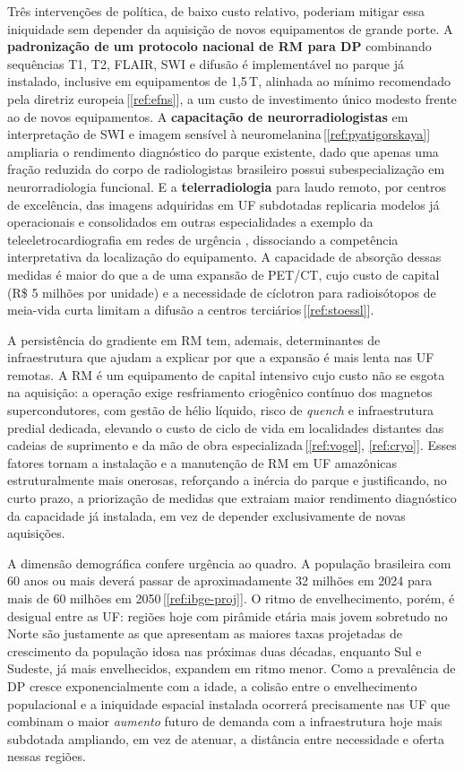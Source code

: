 \documentclass[12pt,a4paper,oneside]{article}
\begin{document}
Três intervenções de política, de baixo custo relativo, poderiam
mitigar essa iniquidade sem depender da aquisição de novos
equipamentos de grande porte. A \textbf{padronização de um protocolo
nacional de RM para DP} \textemdash{} combinando sequências T1, T2,
FLAIR, SWI e difusão \textemdash{} é implementável no parque já
instalado, inclusive em equipamentos de 1,5\,T, alinhada ao mínimo
recomendado pela diretriz europeia\,[\ref{ref:efns}], a um custo de
investimento único modesto frente ao de novos equipamentos. A
\textbf{capacitação de neurorradiologistas} em interpretação de SWI e
imagem sensível à neuromelanina\,[\ref{ref:pyatigorskaya}] ampliaria o
rendimento diagnóstico do parque existente, dado que apenas uma fração
reduzida do corpo de radiologistas brasileiro possui subespecialização
em neurorradiologia funcional. E a \textbf{telerradiologia} para laudo
remoto, por centros de excelência, das imagens adquiridas em UF
subdotadas replicaria modelos já operacionais e consolidados em outras
especialidades \textemdash{} a exemplo da teleeletrocardiografia em
redes de urgência \textemdash{}, dissociando a competência
interpretativa da localização do equipamento. A capacidade de absorção
dessas medidas é maior do que
a de uma expansão de PET/CT, cujo custo de capital
(R\$ 5 milhões por unidade) e a necessidade de cíclotron
para radioisótopos de meia-vida curta limitam a difusão a centros
terciários\,[\ref{ref:stoessl}].

A persistência do gradiente em RM tem, ademais, determinantes de
infraestrutura que ajudam a explicar por que a expansão é mais lenta
nas UF remotas. A RM é um equipamento de capital intensivo cujo custo
não se esgota na aquisição: a operação exige resfriamento criogênico
contínuo dos magnetos supercondutores, com gestão de hélio líquido,
risco de \textit{quench} e infraestrutura predial dedicada, elevando o
custo de ciclo de vida em localidades distantes das cadeias de
suprimento e da mão de obra especializada\,[\ref{ref:vogel},
\ref{ref:cryo}]. Esses fatores tornam a instalação e a manutenção de
RM em UF amazônicas estruturalmente mais onerosas, reforçando a inércia
do parque e justificando, no curto prazo, a priorização de medidas que
extraiam maior rendimento diagnóstico da capacidade já instalada, em
vez de depender exclusivamente de novas aquisições.

A dimensão demográfica confere urgência ao quadro. A população
brasileira com 60 anos ou mais deverá passar de aproximadamente 32
milhões em 2024 para mais de 60 milhões em 2050\,[\ref{ref:ibge-proj}].
O ritmo de envelhecimento, porém, é desigual entre as UF: regiões hoje
com pirâmide etária mais jovem \textemdash{} sobretudo no Norte
\textemdash{} são justamente as que apresentam as maiores taxas
projetadas de crescimento da população idosa nas próximas duas décadas,
enquanto Sul e Sudeste, já mais envelhecidos, expandem em ritmo menor.
Como a prevalência de DP cresce exponencialmente com a idade, a colisão
entre o envelhecimento populacional e a iniquidade espacial instalada
ocorrerá precisamente nas UF que combinam o maior \textit{aumento}
futuro de demanda com a infraestrutura hoje mais subdotada
\textemdash{} ampliando, em vez de atenuar, a distância entre
necessidade e oferta nessas regiões.
\end{document}
